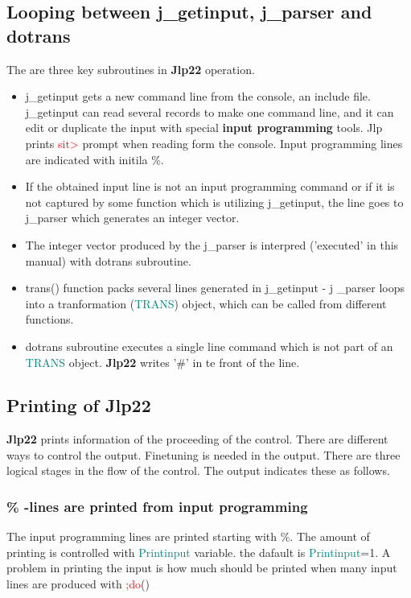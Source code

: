 {\subsection{Looping between j\_getinput, j\_parser and dotrans} 
\label{basicloop} 
The are three key subroutines in \textbf{Jlp22} operation. 
\begin{itemize} 
\item j\_getinput gets a new command line from the console, an include file. j\_getinput can 
read several records to make one command line, and it can edit or duplicate the input 
with special \textbf{input programming} tools. Jlp prints \textcolor{Red}{sit>} prompt 
when reading form the console. Input programming lines are indicated with initila \%. 
\item If the obtained input line is not an input programming command or if it is not 
captured by some function which is utilizing j\_getinput, the line goes to j\_parser which 
generates an integer vector. 
\item The integer vector produced by the j\_parser is interpred ('executed' in this manual) 
with dotrans subroutine. 
\item \textcolor{VioletRed}{trans}() function packs several lines generated in j\_getinput - j \_parser loops 
into a tranformation (\textcolor{teal}{TRANS}) object, which can be called from different functions. 
\item dotrans subroutine executes a single line command which is not part of an \textcolor{teal}{TRANS} object. 
\textbf{Jlp22} writes '\#' in te front of the line. 
\end{itemize} 
\subsection{Printing of \textbf{Jlp22}} 
\label{printing} 
\textbf{Jlp22} prints information of the proceeding of the control. There are different ways to control 
the output. Finetuning is needed in the output. There are three logical 
stages in the flow of the control. The output indicates these as follows. 
\subsubsection{\% -lines are printed from input programming} 
\label{printinpu} 
The input programming lines are printed starting with \%. 
The amount of printing is controlled with \textcolor{teal}{Printinput} variable. 
the dafault is \textcolor{teal}{Printinput}=1. A problem in printing the input is how much should be 
printed when many input lines are produced with \textcolor{Red}{;do}() 
}
